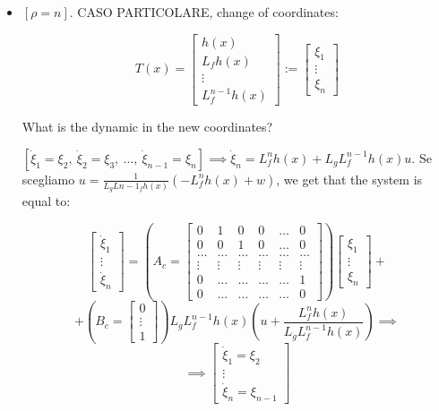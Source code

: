 \begin{itemize}
\item $[\rho = n]$. CASO PARTICOLARE, change of coordinates:

\[
	T(x) = \begin{bmatrix}h(x)\\L_fh(x)\\ \vdots \\ L^{n-1}_fh(x)\end{bmatrix} := \begin{bmatrix}\xi_1 \\ \vdots \\ \xi_n\end{bmatrix}
\]

What is the dynamic in the new coordinates?

$[\dot{\xi}_1 = \xi_2,\ \dot{\xi}_2 = \xi_3,\ \dots,\ \dot{\xi}_{n-1}=\xi_n] \implies \dot{\xi}_n = L^n_fh(x) + L_gL^{n-1}_fh(x)u$. Se scegliamo $u = \frac{1}{L_gL{n-1}_fh(x)}(-L^n_fh(x) + w)$, we get that the system is equal to:

\[
	\begin{bmatrix}\dot{\xi}_1 \\ \vdots \\ \dot{\xi}_n\end{bmatrix} = (A_c = \begin{bmatrix}0&1&0&0& \dots & 0\\0&0&1&0& \dots & 0 \\ \dots & \dots & \dots & \dots & \dots & \dots \\ \vdots & \vdots & \vdots & \vdots & \vdots & \vdots \\ 0& \dots & \dots & \dots & \dots & 1 \\ 0&\dots&\dots&\dots&\dots&0\end{bmatrix})\begin{bmatrix}\xi_1\\ \vdots \\ \xi_n\end{bmatrix} +
\]
\[
	+ (B_c = \begin{bmatrix}0\\ \vdots \\ 1\end{bmatrix})L_gL^{n-1}_fh(x)(u + \frac{L^n_fh(x)}{L_gL^{n-1}_fh(x)}) \implies
\]
\[
	\implies \begin{bmatrix}\dot{\xi}_1 = \xi_2 \\ \vdots \\ \dot{\xi}_n = \xi_{n-1}\end{bmatrix}
\]


\end{itemize}
